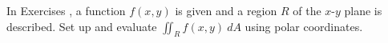 {\noindent In Exercises}
{, a function $f(x,y)$ is given and a region $R$ of the $x$-$y$ plane is described. Set up and evaluate $\iint_Rf(x,y)\ dA$ using polar coordinates.}
